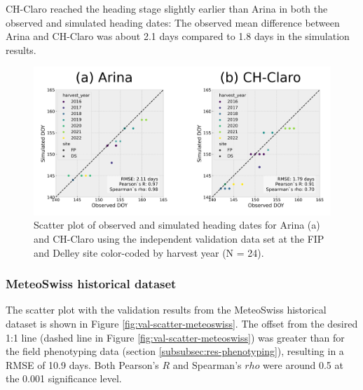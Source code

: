 CH-Claro reached the heading stage slightly earlier than Arina in both the observed and simulated heading dates: The observed mean difference between Arina and CH-Claro was about 2.1 days compared to 1.8 days in the simulation results.

\begin{figure}[H]
    \centering
    \includegraphics[scale=0.7]{03-Heading-Dates/img/scatter_plot_validation_phenotyping.png}
    \caption{Scatter plot of observed and simulated heading dates for Arina (a) and CH-Claro using the independent validation data set at the FIP and Delley site color-coded by harvest year (N = 24).}
    \label{fig:val-scatter}
\end{figure}

\subsubsection{MeteoSwiss historical dataset}
\label{subsubsec:meteoswiss-data}

The scatter plot with the validation results from the MeteoSwiss historical dataset is shown in Figure \ref{fig:val-scatter-meteoswiss}. The offset from the desired 1:1 line (dashed line in Figure \ref{fig:val-scatter-meteoswiss}) was greater than for the field phenotyping data (section \ref{subsubsec:res-phenotyping}), resulting in a \gls{RMSE} of 10.9 days. Both Pearson's $R$ and Spearman's $rho$ were around 0.5 at the 0.001 significance level.

